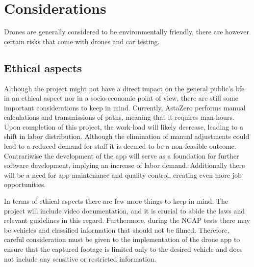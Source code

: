 \chapter{Considerations}
Drones are generally considered to be environmentally friendly, there are however certain risks that come with drones and car testing.
\section{Ethical aspects}
Although the project might not have a direct impact on the general public's life in an ethical aspect nor in a socio-economic point of view, there are still some important considerations to keep in mind. Currently, AstaZero performs manual calculations and transmissions of paths, meaning that it requires man-hours. Upon completion of this project, the work-load will likely decrease, leading to a shift in labor distribution. Although the elimination of manual adjustments could lead to a reduced demand for staff it is deemed to be a non-feasible outcome. Contrariwise the development of the app will serve as a foundation for further software development, implying an increase of labor demand. Additionally there will be a need for app-maintenance and quality control, creating even more job opportunities. 

In terms of ethical aspects there are few more things to keep in mind. The project will include video documentation, and it is crucial to abide the laws and relevant guidelines in this regard. Furthermore, during the NCAP tests there may be vehicles and classified information that should not be filmed. Therefore, careful consideration must be given to the implementation of the drone app to ensure that the captured footage is limited only to the desired vehicle and does not include any sensitive or restricted information.

